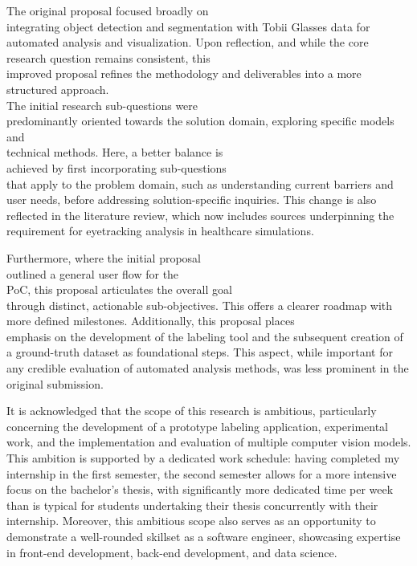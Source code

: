 \documentclass[english]{hogent-article}
\begin{document}
The original proposal focused broadly on\\ integrating object detection and segmentation with Tobii Glasses data for automated analysis and visualization.
Upon reflection, and while the core research question remains consistent, this\\ improved proposal refines the 
methodology and deliverables into a more structured approach.\\
The initial research sub-questions were\\ predominantly oriented towards the solution domain, exploring specific models and\\ technical methods.
Here, a better balance is\\ achieved by first incorporating sub-questions\\ that apply to the problem domain, such as understanding current barriers and user needs, before addressing solution-specific inquiries.
This change is also reflected in the literature review, which now includes sources underpinning the requirement for eyetracking analysis in healthcare simulations.

Furthermore, where the initial proposal\\ outlined a general user flow for the\\ PoC,
this proposal articulates the overall goal\\ through distinct, actionable sub-objectives.
This offers a clearer roadmap with more defined milestones.
Additionally, this proposal places\\ emphasis on the development of the labeling tool and the subsequent creation of a ground-truth dataset as foundational steps.
This aspect, while important for any credible evaluation of automated analysis methods, was less prominent in the original submission.

It is acknowledged that the scope of this research is ambitious, particularly concerning the development of a 
prototype labeling application, experimental work, and the implementation and evaluation of multiple computer vision models.
This ambition is supported by a dedicated work schedule: having completed my internship in the first semester, the second semester allows for a more intensive focus
on the bachelor's thesis, with significantly more dedicated time per week than is typical for students undertaking their thesis concurrently with their internship.
Moreover, this ambitious scope also serves as an opportunity to demonstrate a well-rounded skillset as a software engineer, showcasing expertise in front-end development, back-end development, and data science.
\end{document}
